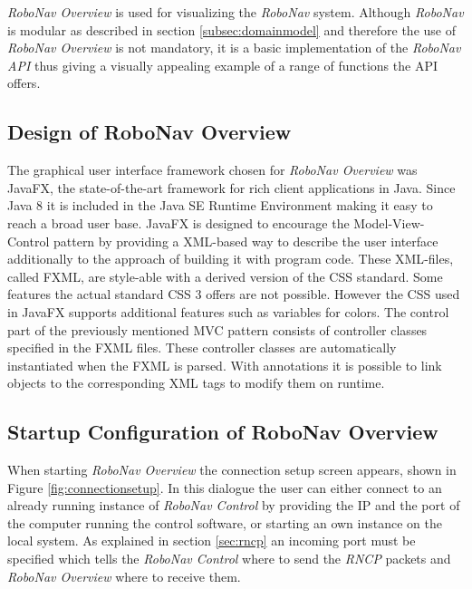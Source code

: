 
\textit{RoboNav Overview} is used for visualizing the \textit{RoboNav} system. Although \textit{RoboNav} is modular as described in section \ref{subsec:domainmodel} and therefore the use of \textit{RoboNav Overview} is not mandatory, it is a basic implementation of the \textit{RoboNav \gls{API}} thus giving a visually appealing example of a range of functions the \gls{API} offers. \\

\subsection{Design of RoboNav Overview}

The graphical user interface framework chosen for \textit{RoboNav Overview} was JavaFX, the state-of-the-art framework for rich client applications in Java. Since Java 8 it is included in the Java SE Runtime Environment making it easy to reach a broad user base. JavaFX is designed to encourage the Model-View-Control pattern by providing a \gls{XML}-based way to describe the user interface additionally to the approach of building it with program code. These \gls{XML}-files, called \gls{FXML}, are style-able with a derived version of the \gls{CSS} standard. Some features the actual standard \gls{CSS} 3 offers are not possible. However the \gls{CSS} used in JavaFX supports additional features such as variables for colors. The control part of the previously mentioned \gls{MVC} pattern consists of controller classes specified in the \gls{FXML} files. These controller classes are automatically instantiated when the \gls{FXML} is parsed. With annotations it is possible to link objects to the corresponding \gls{XML} tags to modify them on runtime.

\subsection{Startup Configuration of RoboNav Overview}
\label{subsec:startupconfigurationofrobonavoverview}

When starting \textit{RoboNav Overview} the connection setup screen appears, shown in Figure \ref{fig:connectionsetup}. In this dialogue the user can either connect to an already running instance of \textit{RoboNav Control} by providing the \gls{IP} and the port of the computer running the control software, or starting an own instance on the local system. As explained in section \ref{sec:rncp} an incoming port must be specified which tells the \textit{RoboNav Control} where to send the \textit{\gls{RNCP}} packets and \textit{RoboNav Overview} where to receive them.

